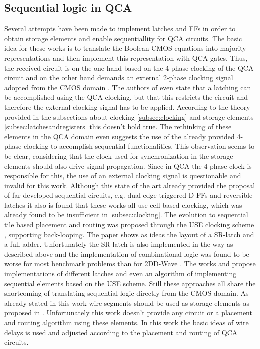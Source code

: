 \subsection{Sequential logic in QCA}
Several attempts \cite{sequential_cell_one, sequential_cell_two, dual_edge_triggered_FF_cell, sequential_reversible_cell} have been made to implement latches and FFs in order to obtain storage elements and enable sequentiallity for QCA circuits. The basic idea for these works is to translate the Boolean CMOS equations into majority representations and then implement this representation with QCA gates. Thus, the received circuit is on the one hand based on the 4-phase clocking of the QCA circuit and on the other hand demands an external 2-phase clocking signal adopted from the CMOS domain \cite{sequential_cell_one}. The authors of \cite{sequential_cell_two} even state that a latching can be accomplished using the QCA clocking, but that this restricts the circuit and therefore the external clocking signal has to be applied. According to the theory provided in the subsections about clocking \ref{subsec:clocking} and storage elements \ref{subsec:latchesandregisters} this doesn't hold true. The rethinking of these elements in the QCA domain even suggests the use of the already provided 4-phase clocking to accomplish sequential functionalities. This observation seems to be clear, considering that the clock used for synchronization in the storage elements should also drive signal propagation. Since in QCA the 4-phase clock is responsible for this, the use of an external clocking signal is questionable and invalid for this work. Although this state of the art already provided the proposal of far developed sequential circuits, e.g. dual edge triggered D-FFs \cite{dual_edge_triggered_FF_cell} and reversible latches \cite{sequential_reversible_cell} it also is found that these works all use cell based clocking, which was already found to be insufficient in \ref{subsec:clocking}. The evolution to sequential tile based placement and routing was proposed through the USE clocking scheme \cite{USE}, supporting back-looping. The paper shows as ideas the layout of a SR-latch and a full adder. Unfortunately the SR-latch is also implemented in the way as described above and the implementation of combinational logic was found to be worse for most benchmark problems than for 2DD-Wave \cite{Walter}. The works \cite{sequential_reversible_tile} and \cite{sequential_tile_CMOS_alg} propose implementations of different latches and even an algorithm of implementing sequential elements based on the USE scheme. Still these approaches all share the shortcoming of translating sequential logic directly from the CMOS domain. As already stated in this work wire segments should be used as storage elements as proposed in \cite{Walter}. Unfortunately this work doesn't provide any circuit or a placement and routing algorithm using these elements. In this work the basic ideas of wire delays is used and adjusted according to the placement and routing of QCA circuits.\\

